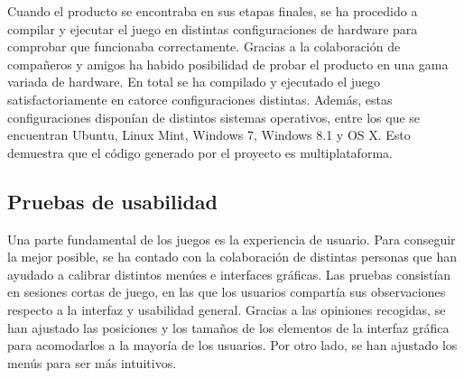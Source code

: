 		Cuando el producto se encontraba en sus etapas finales, se ha procedido a compilar y ejecutar el juego en distintas configuraciones de hardware para comprobar que funcionaba correctamente. Gracias a la colaboración de compañeros y amigos ha habido posibilidad de probar el producto en una gama variada de hardware. En total se ha compilado y ejecutado el juego satisfactoriamente en catorce configuraciones distintas. Además, estas configuraciones disponían de distintos sistemas operativos, entre los que se encuentran Ubuntu, Linux Mint, Windows 7, Windows 8.1 y OS X. Esto demuestra que el código generado por el proyecto es multiplataforma.

	\subsection{Pruebas de usabilidad}

		Una parte fundamental de los juegos es la experiencia de usuario. Para conseguir la mejor posible, se ha contado con la colaboración de distintas personas que han ayudado a calibrar distintos menúes e interfaces gráficas. Las pruebas consistían en sesiones cortas de juego, en las que los usuarios compartía sus observaciones respecto a la interfaz y usabilidad general. Gracias a las opiniones recogidas, se han ajustado las posiciones y los tamaños de los elementos de la interfaz gráfica para acomodarlos a la mayoría de los usuarios. Por otro lado, se han ajustado los menús para ser más intuitivos.
